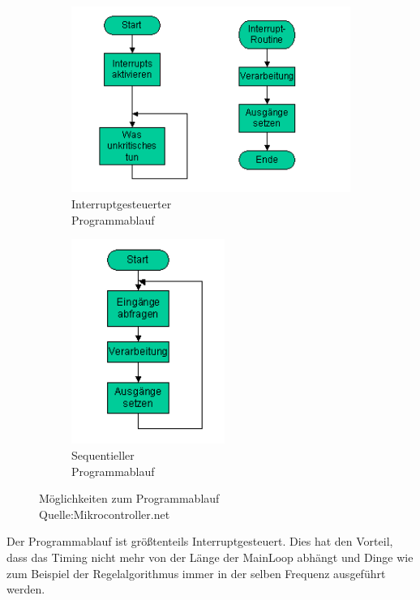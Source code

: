 \documentclass[a4paper, 11pt]{scrartcl}
\begin{document}
			
			\begin{figure}[h]	
				\centering
				\begin{subfigure}{0.47\textwidth}
					\centering
					\includegraphics[width=1.1\textwidth]{bilder/Interrupt_Programme.png}
					\caption{Interruptgesteuerter \\Programmablauf}
					\label{InterruptgesteuerterProgrammablauf}		
				\end{subfigure}
				\begin{subfigure}{0.47\textwidth}
					\centering
					\includegraphics[width=0.55\textwidth]{bilder/Sequentielle_Programme.png}
					\caption{Sequentieller \\Programmablauf}
					\label{SequentiellerProgrammablauf}
				\end{subfigure}
				\caption[Möglichkeiten zum Programmablauf]{Möglichkeiten zum Programmablauf\\Quelle:Mikrocontroller.net}\label{Programmablauf}
			\end{figure}
			Der Programmablauf ist größtenteils Interruptgesteuert.
			Dies hat den Vorteil, dass das Timing nicht mehr von der Länge der MainLoop abhängt und Dinge wie zum  Beispiel der Regelalgorithmus immer in der selben Frequenz ausgeführt werden.
					
\end{document}
